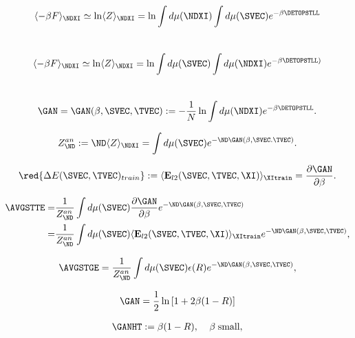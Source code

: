 \begin{align}
\label{eqn:qaFan}
\langle-\beta F \rangle_{\NDXI} \simeq \ln \langle Z \rangle_{\NDXI} = \ln \int d\mu(\NDXI) \int d\mu(\SVEC) e^{-\beta\DETOPSTLL}  \\ \nonumber
\end{align}

\begin{align}
\label{eqn:qaFan3}
\langle-\beta F \rangle_{\NDXI} \simeq \ln \langle Z \rangle_{\NDXI} = \ln \int d\mu(\SVEC)\int d\mu(\NDXI)e^{-\beta\DETOPSTLL)}   \\ \nonumber
\end{align}

\begin{align}
\label{eqn:Gan0}
\GAN = \GAN(\beta,\SVEC,\TVEC):=-\frac{1}{N}\ln\int d\mu(\NDXI)e^{-\beta\DETOPSTLL}.
\end{align}

\begin{align}
 \label{eqn:Zan}
Z^{an}_{\ND}:=\ND\langle Z\rangle_{\NDXI}=\int d\mu(\SVEC)e^{-\ND\GAN(\beta,\SVEC.\TVEC)}  .
\end{align}

\begin{align}
  \label{eqn:Ga1}
\red{\Delta E(\SVEC,\TVEC)_{train}}:=\langle  \mathbf{E}_{l2}(\SVEC,\TVEC,\XI) \rangle_{\XItrain} 
 =\dfrac{\partial \GAN}{\partial \beta}  .
\end{align}

\begin{align}
  \label{eqn:EtM2}
  \AVGSTTE
   =& \dfrac{1}{Z^{an}_{\ND}}\int d\mu(\SVEC)\dfrac{\partial \GAN}{\partial \beta} e^{-\ND\GAN(\beta,\SVEC,\TVEC)} \\ \nonumber
   =& \dfrac{1}{Z^{an}_{\ND}}\int d\mu(\SVEC)\langle  \mathbf{E}_{l2}(\SVEC,\TVEC,\XI) \rangle_{\XItrain} e^{-\ND\GAN(\beta,\SVEC,\TVEC)}  ,
  \end{align}

\begin{align}
\label{eqn:EgCanonical}
\AVGSTGE=\dfrac{1}{Z^{an}_{\ND}}\int d\mu(\SVEC)\epsilon(R)e^{-\ND\GAN(\beta,\SVEC,\TVEC)} ,
\end{align}

\begin{align}
\label{eqn:Gan2}
\GAN = \dfrac{1}{2}\ln\left[{1+2\beta(1-R)}\right]
\end{align}

\begin{align}
\label{eqn:Gan3}
\GANHT:=\beta(1-R),\;\;\;\;\beta\;\text{small},
\end{align}


